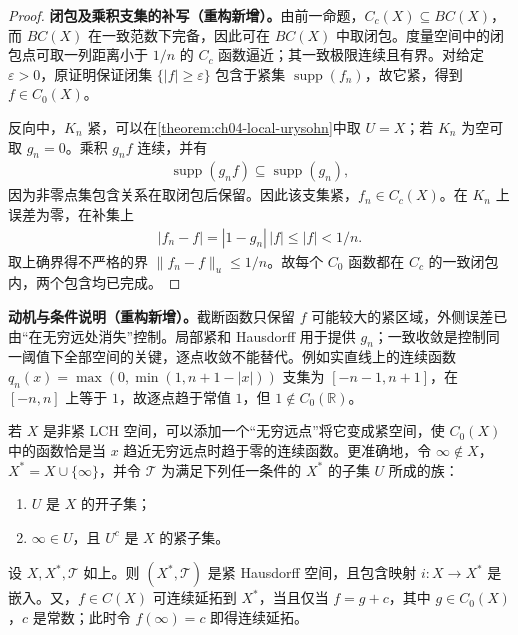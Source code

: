 \documentclass[../../main.tex]{subfiles}%
\begin{document}
\begin{proof}
\textbf{闭包及乘积支集的补写（重构新增）。}由前一命题，$C_c(X)\subseteq BC(X)$，而 $BC(X)$ 在一致范数下完备，因此可在 $BC(X)$ 中取闭包。度量空间中的闭包点可取一列距离小于 $1/n$ 的 $C_c$ 函数逼近；其一致极限连续且有界。对给定 $\varepsilon>0$，原证明保证闭集 $\{|f|\ge\varepsilon\}$ 包含于紧集 $\operatorname{supp}(f_n)$，故它紧，得到 $f\in C_0(X)$。

反向中，$K_n$ 紧，可以在\cref{theorem:ch04-local-urysohn}中取 $U=X$；若 $K_n$ 为空可取 $g_n=0$。乘积 $g_nf$ 连续，并有
\begin{align*}
\operatorname{supp}(g_nf)\subseteq\operatorname{supp}(g_n),
\end{align*}
因为非零点集包含关系在取闭包后保留。因此该支集紧，$f_n\in C_c(X)$。在 $K_n$ 上误差为零，在补集上
\begin{align*}
|f_n-f|=|1-g_n|\,|f|\le |f|<1/n.
\end{align*}
取上确界得不严格的界 $\|f_n-f\|_u\le1/n$。故每个 $C_0$ 函数都在 $C_c$ 的一致闭包内，两个包含均已完成。
\end{proof}
\begin{remark}
\textbf{动机与条件说明（重构新增）。}截断函数只保留 $f$ 可能较大的紧区域，外侧误差已由“在无穷远处消失”控制。局部紧和 Hausdorff 用于提供 $g_n$；一致收敛是控制同一阈值下全部空间的关键，逐点收敛不能替代。例如实直线上的连续函数 $q_n(x)=\max(0,\min(1,n+1-|x|))$ 支集为 $[-n-1,n+1]$，在 $[-n,n]$ 上等于 $1$，故逐点趋于常值 $1$，但 $1\notin C_0(\mathbb R)$。
\end{remark}
若 $X$ 是非紧 LCH 空间，可以添加一个“无穷远点”将它变成紧空间，使 $C_0(X)$ 中的函数恰是当 $x$ 趋近无穷远点时趋于零的连续函数。更准确地，令 $\infty\notin X$，$X^*=X\cup\{\infty\}$，并令 $\mathcal T$ 为满足下列任一条件的 $X^*$ 的子集 $U$ 所成的族：
\begin{enumerate}[label=(\roman*)]
\item $U$ 是 $X$ 的开子集；
\item $\infty\in U$，且 $U^c$ 是 $X$ 的紧子集。
\end{enumerate}
\begin{proposition}\label{proposition:ch04-one-point-compactification}
设 $X,X^*,\mathcal T$ 如上。则 $(X^*,\mathcal T)$ 是紧 Hausdorff 空间，且包含映射 $i:X\to X^*$ 是嵌入。又，$f\in C(X)$ 可连续延拓到 $X^*$，当且仅当 $f=g+c$，其中 $g\in C_0(X)$，$c$ 是常数；此时令 $f(\infty)=c$ 即得连续延拓。
\end{proposition}
\end{document}
